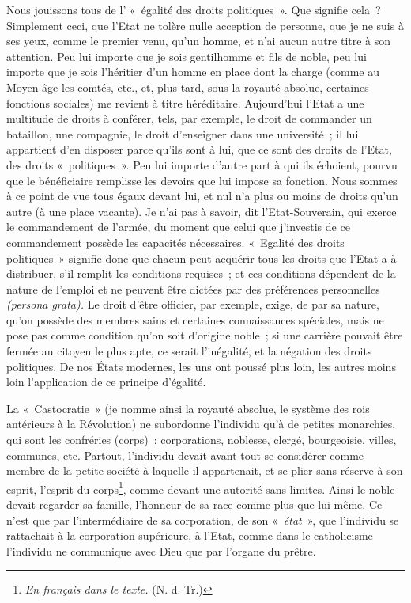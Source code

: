\documentclass[french,twoside]{book} %
\begin{document}
Nous jouissons tous de l’ « égalité des droits politiques ». Que signifie cela ? Simplement ceci, que l’Etat ne tolère nulle acception de personne, que je ne suis à ses yeux, comme le premier venu, qu’un homme, et n’ai aucun autre titre à son attention. Peu lui importe que je sois gentilhomme et fils de noble, peu lui importe que je sois l’héritier d’un homme en place dont la charge (comme au Moyen-âge les comtés, etc., et, plus tard, sous la royauté absolue, certaines fonctions sociales) me revient à titre héréditaire. Aujourd’hui l’Etat a une multitude de droits à conférer, tels, par exemple, le droit de commander un bataillon, une compagnie, le droit d’enseigner dans une université ; il lui appartient d’en disposer parce qu’ils sont à lui, que ce sont des droits de l’Etat, des droits « politiques ». Peu lui importe d’autre part à qui ils échoient, pourvu que le bénéficiaire remplisse les devoirs que lui impose sa fonction. Nous sommes à ce point de vue tous égaux devant lui, et nul n’a plus ou moins de droits qu’un autre (à une place vacante). Je n’ai pas à savoir, dit l’Etat-Souverain, qui exerce le commandement de l’armée, du moment que celui que j’investis de ce commandement possède les capacités nécessaires. « Egalité des droits politiques » signifie donc que chacun peut acquérir tous les droits que l’Etat a à distribuer, s’il remplit les conditions requises ; et ces conditions dépendent de la nature de l’emploi et ne  peuvent être dictées par des préférences personnelles \emph{(persona grata).} Le droit d’être officier, par exemple, exige, de par sa nature, qu’on possède des membres sains et certaines connaissances spéciales, mais ne pose pas comme condition qu’on soit d’origine noble ; si une carrière pouvait être fermée au citoyen le plus apte, ce serait l’inégalité, et la négation des droits politiques. De nos États modernes, les uns ont poussé plus loin, les autres moins loin l’application de ce principe d’égalité.\par
La « Castocratie » (je nomme ainsi la royauté absolue, le système des rois antérieurs à la Révolution) ne subordonne l’individu qu’à de petites monarchies, qui sont les confréries (corps) : corporations, noblesse, clergé, bourgeoisie, villes, communes, etc. Partout, l’individu devait avant tout se considérer comme membre de la petite société à laquelle il appartenait, et se plier sans réserve à son esprit, l’esprit du corps\footnote{ \noindent \emph{ En français dans le texte.} (N. d. Tr.)
 }, comme devant une autorité sans limites. Ainsi le noble devait regarder sa famille, l’honneur de sa race comme plus que lui-même. Ce n’est que par l’intermédiaire de sa corporation, de son « \emph{état} », que l’individu se rattachait à la corporation supérieure, à l’Etat, comme dans le catholicisme l’individu ne communique avec Dieu que par l’organe du prêtre.\par
\end{document}
